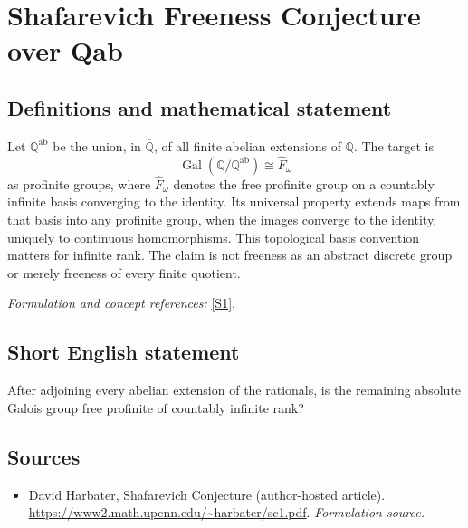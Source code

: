\documentclass[11pt]{article}
\begin{document}
\section*{\texorpdfstring{Shafarevich Freeness Conjecture over Qab}{Shafarevich Freeness Conjecture over Qab}}\label{30006802}
\subsection{Definitions and mathematical statement}
Let ${\mathbb{Q}}^{\mathrm{ab}}$ be the union, in $\overline{{\mathbb{Q}}}$, of all finite abelian extensions of ${\mathbb{Q}}$. The target is
\[
 \operatorname{Gal}(\overline{{\mathbb{Q}}}/{\mathbb{Q}}^{\mathrm{ab}})\cong\widehat F_\omega
\]
as profinite groups, where $\widehat F_\omega$ denotes the free profinite group on a countably infinite basis converging to the identity. Its universal property extends maps from that basis into any profinite group, when the images converge to the identity, uniquely to continuous homomorphisms. This topological basis convention matters for infinite rank. The claim is not freeness as an abstract discrete group or merely freeness of every finite quotient.
\par\smallskip\textit{Formulation and concept references:} \href{https://www2.math.upenn.edu/~harbater/sc1.pdf}{[S1]}.

\subsection{Short English statement}
After adjoining every abelian extension of the rationals, is the remaining absolute Galois group free profinite of countably infinite rank?
\subsection{Sources}
\begin{itemize}
\item[S1]David Harbater, Shafarevich Conjecture (author-hosted article).
\url{https://www2.math.upenn.edu/~harbater/sc1.pdf}.
\textit{Formulation source.}
\end{itemize}
\end{document}
